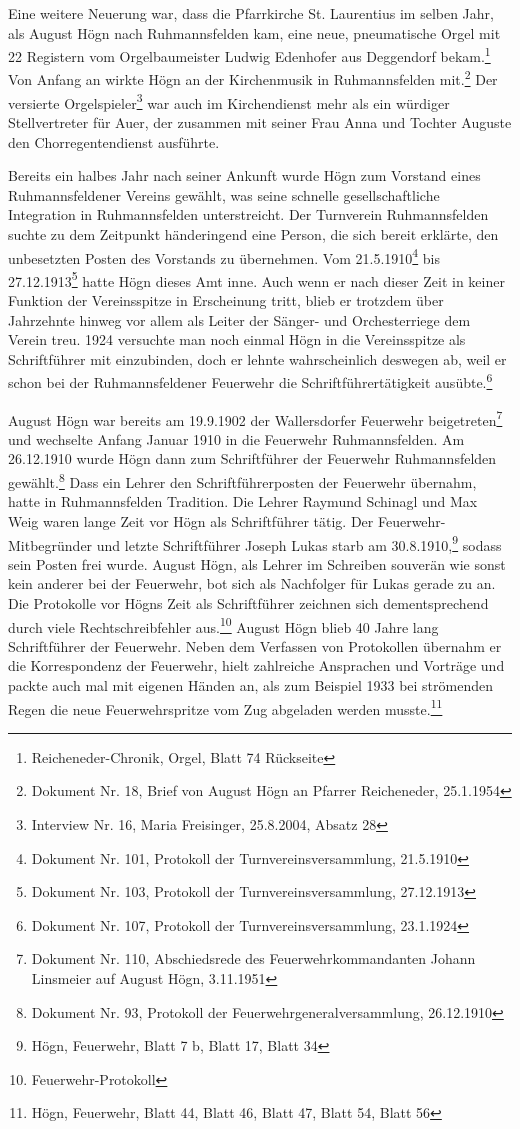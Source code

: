 \documentclass[a4paper]{article}
\begin{document}
Eine weitere Neuerung war, dass die Pfarrkirche St. Laurentius im selben
Jahr, als August Högn nach Ruhmannsfelden kam, eine neue, pneumatische
Orgel mit 22 Registern vom Orgelbaumeister Ludwig Edenhofer aus
Deggendorf bekam.\footnote{ Reicheneder-Chronik, Orgel, Blatt 74
Rückseite} Von Anfang an wirkte Högn an der Kirchenmusik in
Ruhmannsfelden mit.\footnote{ Dokument Nr. 18, Brief von August Högn an
Pfarrer Reicheneder, 25.1.1954} Der versierte Orgelspieler\footnote{
Interview Nr. 16, Maria Freisinger, 25.8.2004, Absatz 28} war auch im
Kirchendienst mehr als ein würdiger Stellvertreter für Auer, der
zusammen mit seiner Frau Anna und Tochter Auguste den
Chorregentendienst ausführte.

Bereits ein halbes Jahr nach seiner Ankunft wurde Högn zum Vorstand
eines Ruhmannsfeldener Vereins gewählt, was seine schnelle
gesellschaftliche Integration in Ruhmannsfelden unterstreicht. Der
Turnverein Ruhmannsfelden suchte zu dem Zeitpunkt händeringend eine
Person, die sich bereit erklärte, den unbesetzten Posten des Vorstands
zu übernehmen. Vom 21.5.1910\footnote{ Dokument Nr. 101, Protokoll der
Turnvereinsversammlung, 21.5.1910}  bis 27.12.1913\footnote{ Dokument
Nr. 103, Protokoll der Turnvereinsversammlung, 27.12.1913} hatte Högn
dieses Amt inne. Auch wenn er nach dieser Zeit in keiner Funktion der
Vereinsspitze in Erscheinung tritt, blieb er trotzdem über Jahrzehnte
hinweg vor allem als Leiter der Sänger- und Orchesterriege dem Verein
treu. 1924 versuchte man noch einmal Högn in die Vereinsspitze als
Schriftführer mit einzubinden, doch er lehnte wahrscheinlich deswegen
ab, weil er schon bei der Ruhmannsfeldener Feuerwehr die
Schriftführertätigkeit ausübte.\footnote{ Dokument Nr. 107, Protokoll
der Turnvereinsversammlung, 23.1.1924}

August Högn war bereits am 19.9.1902 der Wallersdorfer Feuerwehr
beigetreten\footnote{ Dokument Nr. 110, Abschiedsrede des
Feuerwehrkommandanten Johann Linsmeier auf August Högn, 3.11.1951} und
wechselte Anfang Januar 1910 in die Feuerwehr Ruhmannsfelden. Am
26.12.1910 wurde Högn dann zum Schriftführer der Feuerwehr
Ruhmannsfelden gewählt.\footnote{ Dokument Nr. 93, Protokoll der
Feuerwehrgeneralversammlung, 26.12.1910} Dass ein Lehrer den
Schriftführerposten der Feuerwehr übernahm, hatte in Ruhmannsfelden
Tradition. Die Lehrer Raymund Schinagl und Max Weig waren lange Zeit
vor Högn als Schriftführer tätig. Der Feuerwehr-Mitbegründer und letzte
Schriftführer Joseph Lukas starb am 30.8.1910,\footnote{ Högn,
Feuerwehr, Blatt 7 b, Blatt 17, Blatt 34} sodass sein Posten frei
wurde. August Högn, als Lehrer im Schreiben souverän wie sonst kein
anderer bei der Feuerwehr, bot sich als Nachfolger für Lukas gerade zu
an. Die Protokolle vor Högns Zeit als Schriftführer zeichnen sich
dementsprechend durch viele Rechtschreibfehler aus.\footnote{
Feuerwehr-Protokoll} August Högn blieb 40 Jahre lang Schriftführer der
Feuerwehr. Neben dem Verfassen von Protokollen übernahm er die
Korrespondenz der Feuerwehr, hielt zahlreiche Ansprachen und Vorträge
und packte auch mal mit eigenen Händen an, als zum Beispiel 1933 bei
strömenden Regen die neue Feuerwehrspritze vom Zug abgeladen werden
musste.\footnote{ Högn, Feuerwehr, Blatt 44, Blatt 46, Blatt 47, Blatt
54, Blatt 56}
\end{document}
